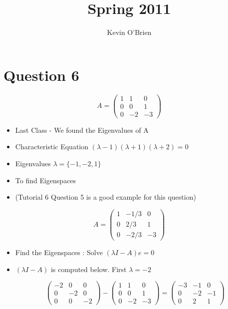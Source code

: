 \documentclass[12pt, a4paper]{report}
\begin{document}
\author{Kevin O'Brien}
\title{Spring 2011}

\newpage
\section*{Question 6}
{\Large
\[ A = \left(
\begin{array}{ccc}
1 & 1 & 0 \\
0 & 0 & 1 \\
0 & -2 & -3
\end{array} \right) \]
\begin{itemize}
\item Last Class - We found the Eigenvalues of A
\item Characteristic Equation $(\lambda - 1)(\lambda + 1)(\lambda + 2)=0$
\item Eigenvalues $\lambda = \{-1,-2,1\}$
\item To find Eigenspaces
\item (Tutorial 6 Question 5 is a good example for this question)
\end{itemize}


\[ A = \left(
\begin{array}{ccc}
1 & -1/3 & 0 \\
0 & 2/3 & 1 \\
0 & -2/3 & -3
\end{array} \right) \]

\newpage
\begin{itemize}
\item Find the Eigenspaces :
 Solve $(\lambda I -A)e=0$
\item $(\lambda I -A)$ is computed below. First $\lambda =-2$

\[
\left(
\begin{array}{ccc}
-2 & 0  & 0  \\
 0 & -2  & 0  \\
 0 &  0 & -2
\end{array}
\right) -
\left(
\begin{array}{ccc}
1 & 1  & 0  \\
 0 & 0  & 1  \\
 0 &  -2 & -3
\end{array}
\right) = \left(\begin{array}{ccc}
-3 & -1 & 0 \\
0 & -2 & -1 \\
0 & 2 & 1
\end{array} \right)\]
\end{itemize}

}
\end{document}
